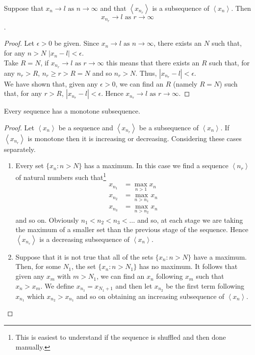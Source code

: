 \documentclass[10pt, a4paper]{article}
\newcommand{\limas}[3][n]{#2 \rightarrow #3 \text{ as } #1 \rightarrow \infty}
\newcommand{\seq}[1][x_n]{\left\langle #1 \right\rangle}
\begin{document}
\begin{theorem}\label{thm_limsubseq}
    Suppose that $\limas{x_n}{l}$ and that $\seq[x_{n_r}]$ is a subsequence of $\seq$. Then $$\limas[r]{x_{n_r}}{l}$$.
    \begin{proof}
        Let $\epsilon > 0$ be given. Since $\limas{x_n}{l}$, there exists an $N$ such that, for any $n > N$ $|x_n - l| < \epsilon$. \\
        Take $R = N$, if $\limas[r]{x_{n_r}}{l}$ this means that there exists an $R$ such that, for any $n_r > R$, $n_r \geq r > R = N$ and so $n_r > N$. Thus, $|x_{n_r} - l| < \epsilon.$ \\
        We have shown that, given any $\epsilon > 0$, we can find an $R$ (namely $R = N$) such that, for any $r > R$, $|x_{n_r} - l| < \epsilon.$ Hence $\limas[r]{x_{n_r}}{l}$.
    \end{proof}
\end{theorem}

\begin{theorem}\label{thm_seqhasmono}
    Every sequence has a monotone subsequence.
    \begin{proof}
    Let $\seq$ be a sequence and $\seq[x_{n_r}]$ be a subsequence of $\seq$. If $\seq[x_{n_r}]$ is monotone then it is increasing or decreasing. Considering these cases separately.
    \begin{enumerate}[label = (\roman*)]
        \item Every set $\{x_n: n > N\}$ has a maximum. In this case we find a sequence $\seq[n_r]$ of natural numbers such that\footnote{This is easiest to understand if the sequence is shuffled and then done manually.}
        \begin{align*}
            x_{n_1} &= \max_{n > 1}{x_n} \\
            x_{n_2} &= \max_{n > n_1}{x_n} \\
            x_{n_3} &= \max_{n > n_2}{x_n}
        \end{align*}
        and so on.  Obviously $n_1 < n_2 < n_3 < \dots$ and so, at each stage we are taking the maximum of a smaller set than the previous stage of the sequence. Hence $\seq[x_{n_r}]$ is a decreasing subsequence of $\seq$.
        \item Suppose that it is not true that all of the sets $\{x_n: n > N\}$ have a maximum. Then, for some $N_1$, the set $\{x_n: n > N_1\}$ has no maximum. It follows that given any $x_m$ with $m > N_1$, we can find an $x_n$ following $x_m$ such that $x_n > x_m$. We define $x_{n_1} = x_{N_1 + 1}$ and then let $x_{n_2}$ be the first term following $x_{n_1}$ which $x_{n_2} > x_{n_1}$ and so on obtaining an increasing subsequence of $\seq$. 
    \end{enumerate}
    \end{proof}
\end{theorem}
\end{document}
